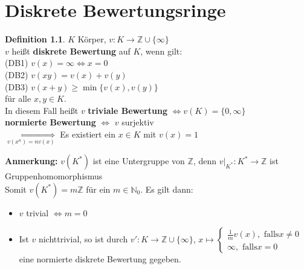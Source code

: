\documentclass[10pt,a4paper,numbers=endperiod]{scrreprt}
\theoremstyle{definition}
\newtheorem{defi}[satz]{Definition}
\def\NN{{\mathbb N}}
\def\ZZ{{\mathbb Z}}
\begin{document}
\chapter{Diskrete Bewertungsringe} 

\begin{defi}
	$K$ Körper, $v: K \to \ZZ \cup \{ \infty\}$\\
	$v$ heißt \textbf{diskrete Bewertung} auf $K$, wenn gilt:\\
	(DB1) $v(x) = \infty \Leftrightarrow x = 0$\\
	(DB2) $v(xy) = v(x) + v(y)$\\
	(DB3) $v(x+y) \geq \min \{v(x), v(y)\}$\\
	für alle $x,y \in K$.\\
	In diesem Fall heißt $v$ \textbf{triviale Bewertung} $\Leftrightarrow v(K) = \{0, \infty\}$\\
	\textbf{normierte Bewertung} $\Leftrightarrow$ $v$ surjektiv\\
	$\underset{v(x^n) =  nv(x)}{\Leftrightarrow}$ Es existiert ein $x \in K$ mit $v(x) = 1$
\end{defi}

\textbf{Anmerkung:} $v(K^*)$ ist eine Untergruppe von $\ZZ$, denn $v|_{K^*}: K^* \longrightarrow \ZZ$ ist Gruppenhomomorphismus\\
Somit $v(K^*) = m \ZZ$ für ein $m \in \NN_0$. Es gilt dann: \begin{itemize}
	\item $v$ trivial $\Leftrightarrow m = 0$
	\item Ist $v$ nichttrivial, so ist durch $v': K \to \ZZ \cup \{\infty\}$, $x \mapsto \begin{cases}
	\frac{1}{m} v(x), \text{ falls} x \neq 0\\
	\infty, \text{ falls} x = 0
	\end{cases}$\\
	eine normierte diskrete Bewertung gegeben.
\end{itemize}
\end{document}
